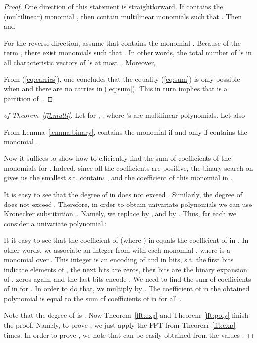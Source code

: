 \begin{proof}
One direction of this statement is straightforward.
If  contains the (multilinear) monomial , then
 contain multilinear monomials  such that
. Then 
 and


For the reverse direction, assume that  contains
the monomial . Because of the term ,
there exist  monomials  such that 
. In other words, the total number of 's in 
all characteristic vectors of 's at most~. Moreover,

From (\ref{eq:carries}), one concludes that the equality  (\ref{eq:sum})
is only possible when 
and there are no carries in  (\ref{eq:sum}).
This in turn implies that  is a partition of~.
\end{proof}

\begin{proof}[of Theorem~\ref{fft:multi}]
Let for , , where 's are multilinear polynomials. Let also 

From Lemma~\ref{lemma:binary},  contains the monomial   if and only if  contains the monomial  .

Now it suffices to show how to efficiently find the sum of coefficients of the monomials  for . Indeed, since all the coefficients are positive, the binary search on  gives us the smallest  s.t.  contains , and the coefficient of this monomial in . 

It is easy to see that the degree of  in  does not exceed . Similarly, the degree of  does not exceed . Therefore, in order to obtain univariate polynomials we can use Kronecker substitution~\cite{K1882}. Namely, we replace  by , and  by . Thus, for each  we consider a univariate polynomial :

It it easy to see that the coefficient of  (where ) in  equals the coefficient of  in .
In other words, we associate an integer from  with each monomial , where  is a monomial over . This integer is an encoding of  and  in  bits, s.t. the first  bits indicate elements of , the next  bits are zeros, then  bits are the binary expansion of ,  zeros again, and the last  bits encode .
We need to find the sum of coefficients of  in  for .
 In order to do that, we multiply  by . The coefficient of 
 in the obtained polynomial  is equal to the sum of coefficients of  in  for all .

Note that the degree of  is . Now Theorem~\ref{fft:exp} and Theorem~\ref{fft:poly} finish the proof. Namely, to prove , we just apply the FFT from Theorem~\ref{fft:exp}  times. In order to prove , we note that  can be easily obtained from the values .
\end{proof}




